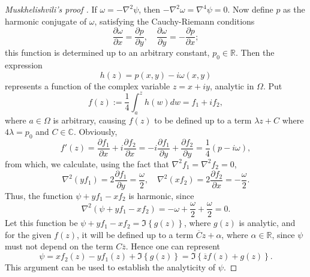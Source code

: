 \documentclass{article}
\newcommand{\reals}{\mathbb{R}}
\newcommand{\conj}[1]{{\overline{#1}}}
\begin{document}
\begin{proof}[Muskhelishvili's proof \cite{musk19}]
If $\omega=-\nabla^2 \psi$, then $-\nabla^2\omega = \nabla^4\psi = 0$. Now
define $p$ as the harmonic conjugate of $\omega$, satisfying the
Cauchy-Riemann conditions
\begin{equation}
\frac{\partial\omega}{\partial x} = \frac{\partial p}{\partial y}, \quad
\frac{\partial\omega}{\partial y} = -\frac{\partial p}{\partial x};
\end{equation}
this function is determined up to an arbitrary constant, $p_0\in\reals$. Then
the expression
\begin{equation}
h(z) = p(x,y)-i\omega(x,y)
\end{equation}
represents a function of the complex variable $z=x+iy$, analytic in $\Omega$. Put
\begin{equation}
f(z) := \frac{1}{4} \int_a^z h(w) dw = f_1 + if_2,
\end{equation}
where $a\in\Omega$ is arbitrary, causing $f(z)$ to be defined up to a term
$\lambda z +C$ where $4\lambda=p_0$ and $C\in\mathbb{C}$. Obviously,
\begin{equation}\label{eq:fprime}
f'(z) = \frac{\partial f_1}{\partial x} + i \frac{\partial f_2}{\partial x} 
   = -i \frac{\partial f_1}{\partial y} + \frac{\partial f_2}{\partial y} 
   = \frac{1}{4} \left(p-i\omega\right),
\end{equation}
from which, we calculate, using the fact that $\nabla^2 f_1=\nabla^2 f_2=0$,
\begin{equation}
\nabla^2\left(y f_1\right) = 2\frac{\partial f_1}{\partial y} 
   = \frac{\omega}{2},\quad \nabla^2\left(x f_2\right) 
   = 2\frac{\partial f_2}{\partial x} = -\frac{\omega}{2}.
\end{equation}
Thus, the function $\psi + yf_1 - xf_2$ is harmonic, since
\begin{equation}
\nabla^2 \left(\psi + yf_1 - xf_2\right) 
   = -\omega + \frac{\omega}{2} + \frac{\omega}{2} =0.
\end{equation}
Let this function be $\psi + yf_1 - xf_2 = \Im\left\{g(z)\right\}$, where
$g(z)$ is analytic, and for the given $f(z)$, it will be defined up to a
term $\conj{C}z+\alpha$, where $\alpha\in\reals$, since $\psi$ must not
depend on the term $C\conj{z}$. Hence one can represent
\begin{equation}
\psi = x f_2(z) -y f_1(z) + \Im\left\{g(z)\right\} 
     = \Im\left\{\conj{z}f(z) + g(z)\right\}.
\end{equation}
This argument can be used to establish the analyticity of $\psi$.
\end{proof}
\end{document}

